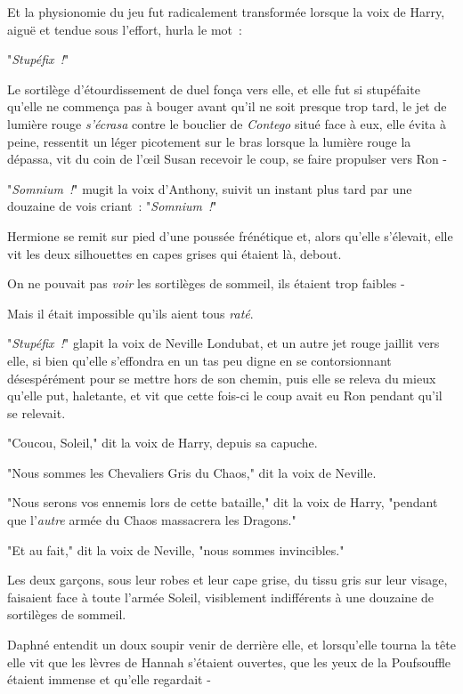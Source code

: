 Et la physionomie du jeu fut radicalement transformée lorsque la voix de Harry, aiguë et tendue sous l'effort, hurla le mot~:

"\emph{Stupéfix~!}"

Le sortilège d'étourdissement de duel fonça vers elle, et elle fut si stupéfaite qu'elle ne commença pas à bouger avant qu'il ne soit presque trop tard, le jet de lumière rouge \emph{s'écrasa} contre le bouclier de \emph{Contego} situé face à eux, elle évita à peine, ressentit un léger picotement sur le bras lorsque la lumière rouge la dépassa, vit du coin de l'œil Susan recevoir le coup, se faire propulser vers Ron -

"\emph{Somnium~!}" mugit la voix d'Anthony, suivit un instant plus tard par une douzaine de vois criant~: "\emph{Somnium~!}"

Hermione se remit sur pied d'une poussée frénétique et, alors qu'elle s'élevait, elle vit les deux silhouettes en capes grises qui étaient là, debout.

On ne pouvait pas \emph{voir} les sortilèges de sommeil, ils étaient trop faibles -

Mais il était impossible qu'ils aient tous \emph{raté}.

"\emph{Stupéfix~!}" glapit la voix de Neville Londubat, et un autre jet rouge jaillit vers elle, si bien qu'elle s'effondra en un tas peu digne en se contorsionnant désespérément pour se mettre hors de son chemin, puis elle se releva du mieux qu'elle put, haletante, et vit que cette fois-ci le coup avait eu Ron pendant qu'il se relevait.

"Coucou, Soleil," dit la voix de Harry, depuis sa capuche.

"Nous sommes les Chevaliers Gris du Chaos," dit la voix de Neville.

"Nous serons vos ennemis lors de cette bataille," dit la voix de Harry, "pendant que l'\emph{autre} armée du Chaos massacrera les Dragons."

"Et au fait," dit la voix de Neville, "nous sommes invincibles."

\later

Les deux garçons, sous leur robes et leur cape grise, du tissu gris sur leur visage, faisaient face à toute l'armée Soleil, visiblement indifférents à une douzaine de sortilèges de sommeil.

Daphné entendit un doux soupir venir de derrière elle, et lorsqu'elle tourna la tête elle vit que les lèvres de Hannah s'étaient ouvertes, que les yeux de la Poufsouffle étaient immense et qu'elle regardait -

